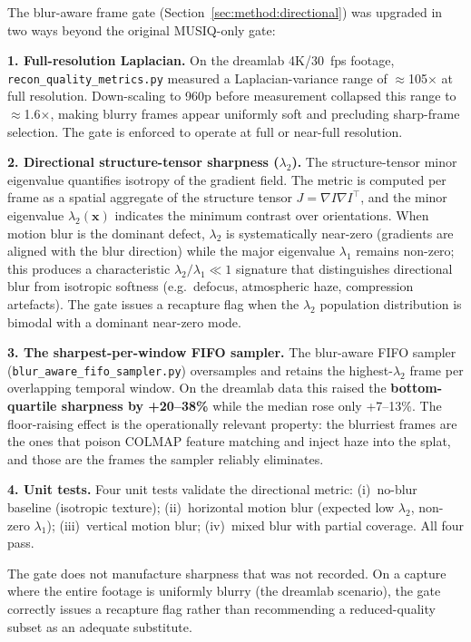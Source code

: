 The blur-aware frame gate (Section~\ref{sec:method:directional}) was upgraded in two ways
beyond the original MUSIQ-only gate:

\textbf{1. Full-resolution Laplacian.}  On the dreamlab 4K/30~fps footage,
\texttt{recon\_quality\_metrics.py} measured a Laplacian-variance range of $\approx$105$\times$
at full resolution.  Down-scaling to 960p before measurement collapsed this range to
$\approx$1.6$\times$, making blurry frames appear uniformly soft and precluding
sharp-frame selection.  The gate is enforced to operate at full or near-full resolution.

\textbf{2. Directional structure-tensor sharpness ($\lambda_2$).}  The structure-tensor
minor eigenvalue quantifies isotropy of the gradient field.  The metric is computed per
frame as a spatial aggregate of the structure tensor $J = \nabla I \nabla I^\top$, and the
minor eigenvalue $\lambda_2(\mathbf{x})$ indicates the minimum contrast over orientations.
When motion blur is the dominant defect, $\lambda_2$ is systematically near-zero
(gradients are aligned with the blur direction) while the major eigenvalue $\lambda_1$
remains non-zero; this produces a characteristic $\lambda_2 / \lambda_1 \ll 1$ signature
that distinguishes directional blur from isotropic softness (e.g.\ defocus, atmospheric
haze, compression artefacts).  The gate issues a recapture flag when the $\lambda_2$
population distribution is bimodal with a dominant near-zero mode.

\textbf{3. The sharpest-per-window FIFO sampler.}  The blur-aware FIFO sampler
(\texttt{blur\_aware\_fifo\_sampler.py}) oversamples and retains the highest-$\lambda_2$
frame per overlapping temporal window.  On the dreamlab data this raised the
\textbf{bottom-quartile sharpness by +20--38\%} while the median rose only +7--13\%.
The floor-raising effect is the operationally relevant property: the blurriest frames are
the ones that poison COLMAP feature matching and inject haze into the splat, and those are
the frames the sampler reliably eliminates.

\textbf{4. Unit tests.}  Four unit tests validate the directional metric: (i)~no-blur
baseline (isotropic texture); (ii)~horizontal motion blur (expected low $\lambda_2$,
non-zero $\lambda_1$); (iii)~vertical motion blur; (iv)~mixed blur with partial coverage.
All four pass.

The gate does not manufacture sharpness that was not recorded.  On a capture where the
entire footage is uniformly blurry (the dreamlab scenario), the gate correctly issues a
recapture flag rather than recommending a reduced-quality subset as an adequate substitute.

